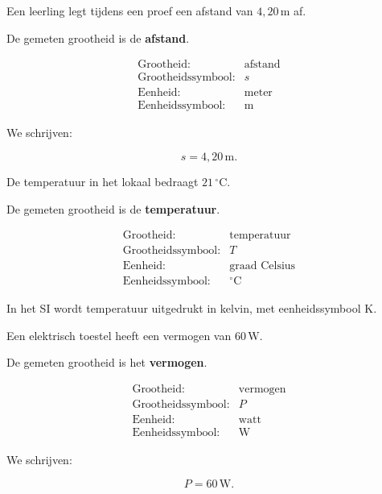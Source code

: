 \documentclass{ximera}
\begin{document}
\begin{oefening}{\oefB\ESS}
\begin{question}
Een leerling legt tijdens een proef een afstand van
$4{,}20\,\mathrm{m}$ af.

\begin{oplossing}
De gemeten grootheid is de \textbf{afstand}.

\[
\begin{array}{ll}
\text{Grootheid:} & \text{afstand} \\
\text{Grootheidssymbool:} & s \\
\text{Eenheid:} & \text{meter} \\
\text{Eenheidssymbool:} & \mathrm{m}
\end{array}
\]

We schrijven:

\[
s = 4{,}20\,\mathrm{m}.
\]
\end{oplossing}
\end{question}


\begin{question}
De temperatuur in het lokaal bedraagt $21\,^\circ\mathrm{C}$.

\begin{oplossing}
De gemeten grootheid is de \textbf{temperatuur}.

\[
\begin{array}{ll}
\text{Grootheid:} & \text{temperatuur} \\
\text{Grootheidssymbool:} & T \\
\text{Eenheid:} & \text{graad Celsius} \\
\text{Eenheidssymbool:} & {}^\circ\mathrm{C}
\end{array}
\]

In het SI wordt temperatuur uitgedrukt in kelvin, met
eenheidssymbool $\mathrm{K}$.
\end{oplossing}
\end{question}


\begin{question}
Een elektrisch toestel heeft een vermogen van $60\,\mathrm{W}$.

\begin{oplossing}
De gemeten grootheid is het \textbf{vermogen}.

\[
\begin{array}{ll}
\text{Grootheid:} & \text{vermogen} \\
\text{Grootheidssymbool:} & P \\
\text{Eenheid:} & \text{watt} \\
\text{Eenheidssymbool:} & \mathrm{W}
\end{array}
\]

We schrijven:

\[
P = 60\,\mathrm{W}.
\]
\end{oplossing}
\end{question}

\end{oefening}
\end{document}
